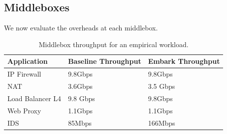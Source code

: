 \documentclass[letterpaper,twocolumn,10pt]{article}
\newcommand{\sys}{Embark\xspace} %
\providecommand{\DIFdelbeginFL}{} %
\providecommand{\DIFdelendFL}{} %
\begin{document}

\subsection{Middleboxes}
\label{sec:evalcloud}

We now evaluate the overheads at each middlebox. 

\begin{table}[t!]
\small
\begin{tabular}{p{2.5cm}|p{2cm}|p{2cm}}
{\bf Application} &  {\bf Baseline Throughput} & {\bf \sys Throughput} \\
\hline \hline
IP Firewall &  9.8Gbps &  9.8Gbps \\
NAT & 3.6Gbps   &   3.5 Gbps \\
Load Balancer L4  &9.8 Gbps & 9.8Gbps \\
Web Proxy &1.1Gbps &1.1Gbps\\
IDS & 85Mbps & 166Mbps~\cite{blindbox}   \\
\end{tabular}
\caption{Middlebox throughput for an empirical workload. \label{tbl:appsxput}}
\DIFdelbeginFL %
\DIFdelendFL \end{table}
\end{document}
